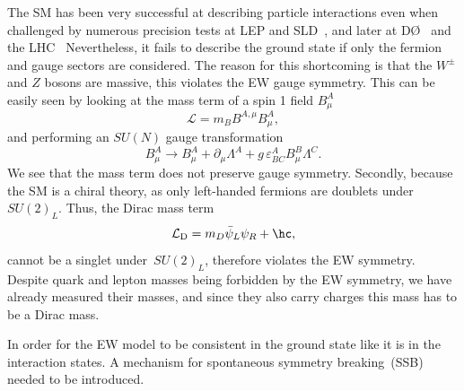 \par The SM has been very successful at describing particle interactions even when challenged by numerous precision tests at LEP and SLD~\cite{ALEPH:2005ab,SLD:2000jop,Group:2012gb,ALEPH:2013dgf}, and later at D\O~\cite{2011baz} and the LHC~\cite{CMS:2014mgj,ATLAS:2017rzl} Nevertheless, it fails to describe the ground state if only the fermion and gauge sectors are considered. The reason for this shortcoming is that the $W^\pm$ and $Z$ bosons are massive, this violates the EW gauge symmetry. This can be easily seen by looking at the mass term of a spin 1 field $B^A_\mu$
\begin{equation}
    \mathcal{L} = m_B B^{A,\mu}B^A_\mu,
\end{equation}
and performing an $SU(N)$ gauge transformation 
\begin{equation}
    B^A_\mu \to B^A_\mu+\partial_\mu \Lambda ^A+g \,\varepsilon^A_{BC} B^B_\mu \Lambda^C.
\end{equation}
We see that the mass term does not preserve gauge symmetry.
Secondly, because the SM is a chiral theory, as only left-handed fermions are doublets under~$SU(2)_L$. Thus, the Dirac mass term
\begin{equation}
    \mathcal{L}_{\mathrm{D}} = m_D \bar \psi_L \psi_R+ \hc,
\end{equation}          
cannot be a singlet under~$SU(2)_L$, therefore violates the EW symmetry. Despite quark and lepton masses being forbidden by the EW symmetry, we have already measured their masses, and since they also carry charges this mass has to be a Dirac mass. 
\par In order for the EW model to be consistent in the ground state like it is in the interaction states. A mechanism for spontaneous symmetry breaking~(SSB) needed to be introduced. 
